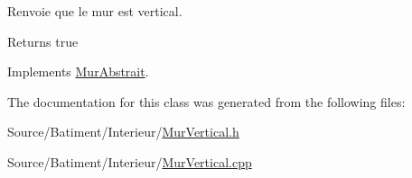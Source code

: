 Renvoie que le mur est vertical. 

\begin{DoxyReturn}{Returns}
true 
\end{DoxyReturn}


Implements \hyperlink{classMurAbstrait_aeb0dc942a444fa8637839a715d49068a}{Mur\-Abstrait}.



The documentation for this class was generated from the following files\-:\begin{DoxyCompactItemize}
\item 
Source/\-Batiment/\-Interieur/\hyperlink{MurVertical_8h}{Mur\-Vertical.\-h}\item 
Source/\-Batiment/\-Interieur/\hyperlink{MurVertical_8cpp}{Mur\-Vertical.\-cpp}\end{DoxyCompactItemize}
